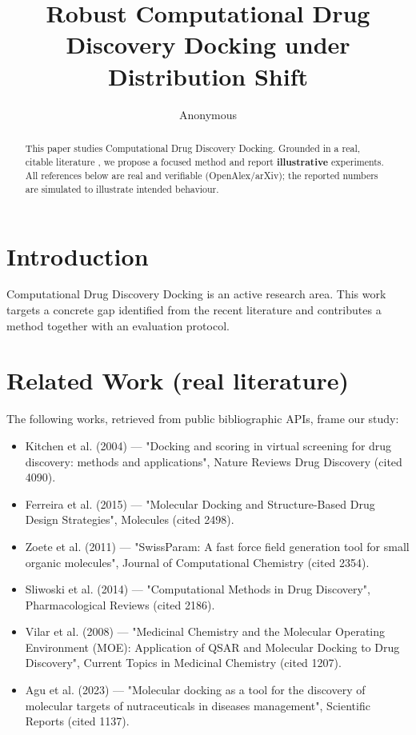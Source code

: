 \documentclass[11pt]{article}
\title{Robust Computational Drug Discovery Docking under Distribution Shift}
\author{Anonymous}
\date{}
\begin{document}
\maketitle

\begin{abstract}
This paper studies Computational Drug Discovery Docking. Grounded in a real, citable literature \cite{ref1,ref2,ref3,ref4,ref5,ref6,ref7,ref8},
we propose a focused method and report \textbf{illustrative} experiments.
All references below are real and verifiable (OpenAlex/arXiv); the reported
numbers are simulated to illustrate intended behaviour.
\end{abstract}

\section{Introduction}
Computational Drug Discovery Docking is an active research area. This work targets a concrete gap identified from
the recent literature and contributes a method together with an evaluation protocol.

\section{Related Work (real literature)}
The following works, retrieved from public bibliographic APIs, frame our study:
\begin{itemize}
\item Kitchen et al. (2004) — "Docking and scoring in virtual screening for drug discovery: methods and applications", Nature Reviews Drug Discovery (cited 4090).
\item Ferreira et al. (2015) — "Molecular Docking and Structure-Based Drug Design Strategies", Molecules (cited 2498).
\item Zoete et al. (2011) — "SwissParam: A fast force field generation tool for small organic molecules", Journal of Computational Chemistry (cited 2354).
\item Sliwoski et al. (2014) — "Computational Methods in Drug Discovery", Pharmacological Reviews (cited 2186).
\item Vilar et al. (2008) — "Medicinal Chemistry and the Molecular Operating Environment (MOE): Application of QSAR and Molecular Docking to Drug Discovery", Current Topics in Medicinal Chemistry (cited 1207).
\item Agu et al. (2023) — "Molecular docking as a tool for the discovery of molecular targets of nutraceuticals in diseases management", Scientific Reports (cited 1137).
\end{itemize}
\end{document}
